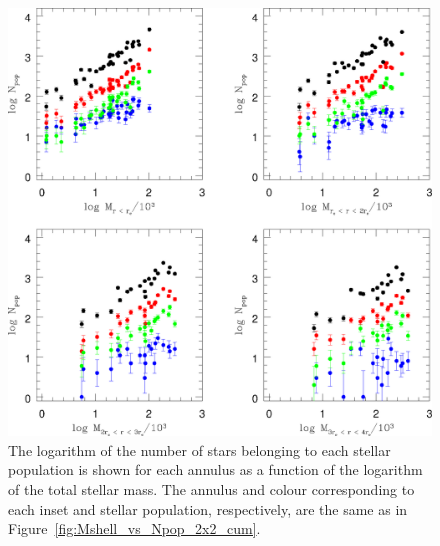 \begin{figure} [!h]
  \begin{center}
 \includegraphics[scale=0.5]{Chapter-4/fig4.eps}
\caption[Plot showing for each annulus the logarithm of the number of
stars belonging to each stellar population as a function of the
logarithm of the total stellar mass]{The logarithm of the number of
  stars belonging to each stellar population is shown for each annulus
  as a function of the logarithm of the total
stellar mass.  The annulus and colour corresponding to each inset and
stellar population, respectively, are the same as in
Figure~\ref{fig:Mshell_vs_Npop_2x2_cum}.
\label{fig:Mshell_vs_Npop_2x2_noncum}}
\end{center}
\end{figure}

\clearpage

